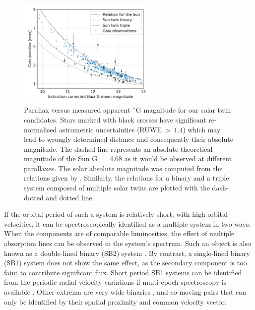 \begin{figure}
	\centering
	\includegraphics[width=0.6\textwidth]{mag_parallax_gaia_ebv_c3_07.png}
	\caption{Parallax versus measured apparent \G\ G magnitude for our solar twin candidates. Stars marked with black crosses have significant re-normalised astrometric uncertainties (RUWE~>~$1.4$) which may lead to wrongly determined distance and consequently their absolute magnitude. The dashed line represents an absolute theoretical magnitude of the Sun G~=~$4.68$ as it would be observed at different parallaxes. The solar absolute magnitude was computed from the relations given by \citet{2018arXiv180409368E}. Similarly, the relations for a binary and a triple system composed of multiple solar twins are plotted with the dash-dotted and dotted line.}
	\label{fig:par_gmean}
\end{figure}

If the orbital period of such a system is relatively short, with high orbital velocities, it can be spectroscopically identified as a multiple system in two ways. When the components are of comparable luminosities, the effect of multiple absorption lines can be observed in the system's spectrum. Such an object is also known as a double-lined binary (SB2) system \cite{2004A&A...424..727P, 2010AJ....140..184M, 2017PASP..129h4201F, 2017A&A...608A..95M}. By contrast, a single-lined binary (SB1) system does not show the same effect, as the secondary component is too faint to contribute significant flux. Short period SB1 systems can be identified from the periodic radial velocity variations if multi-epoch spectroscopy is available \cite{1991A&A...248..485D, 2004A&A...418..989N, 2011AJ....141..200M, 2016AJ....151...85T, 2018ApJ...854..147B}. Other extrema are very wide binaries \cite{1988ApJ...335L..47G, 1990AJ....100.1968C, 1995ApJ...441..200G, 2009ApJ...703.1511K, 2011ApJS..192....2S, 2017MNRAS.472..675A, 2018MNRAS.480.4302C}, and co-moving pairs \cite{2017AJ....153..257O, 2019AJ....157...78J} that can only be identified by their spatial proximity and common velocity vector.

